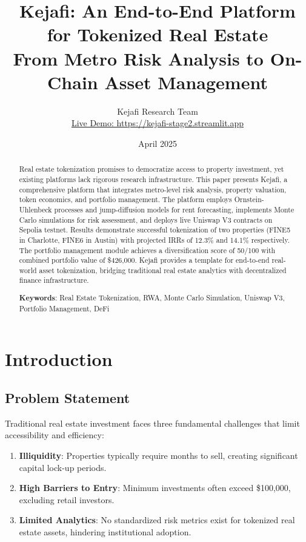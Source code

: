 ﻿\documentclass[12pt]{article}
\title{Kejafi: An End-to-End Platform for Tokenized Real Estate \\
\large From Metro Risk Analysis to On-Chain Asset Management}
\author{Kejafi Research Team \\
\href{https://kejafi-stage2.streamlit.app}{Live Demo: https://kejafi-stage2.streamlit.app}}
\date{April 2025}
\begin{document}
\maketitle

\begin{abstract}
\noindent
Real estate tokenization promises to democratize access to property investment, yet existing platforms lack rigorous research infrastructure. This paper presents Kejafi, a comprehensive platform that integrates metro-level risk analysis, property valuation, token economics, and portfolio management. The platform employs Ornstein-Uhlenbeck processes and jump-diffusion models for rent forecasting, implements Monte Carlo simulations for risk assessment, and deploys live Uniswap V3 contracts on Sepolia testnet. Results demonstrate successful tokenization of two properties (FINE5 in Charlotte, FINE6 in Austin) with projected IRRs of 12.3\% and 14.1\% respectively. The portfolio management module achieves a diversification score of 50/100 with combined portfolio value of \$426,000. Kejafi provides a template for end-to-end real-world asset tokenization, bridging traditional real estate analytics with decentralized finance infrastructure.

\vspace{1em}
\noindent\textbf{Keywords}: Real Estate Tokenization, RWA, Monte Carlo Simulation, Uniswap V3, Portfolio Management, DeFi
\end{abstract}

\section{Introduction}

\subsection{Problem Statement}

Traditional real estate investment faces three fundamental challenges that limit accessibility and efficiency:

\begin{enumerate}
    \item \textbf{Illiquidity}: Properties typically require months to sell, creating significant capital lock-up periods.
    \item \textbf{High Barriers to Entry}: Minimum investments often exceed \$100,000, excluding retail investors.
    \item \textbf{Limited Analytics}: No standardized risk metrics exist for tokenized real estate assets, hindering institutional adoption.
\end{enumerate}
\end{document}
